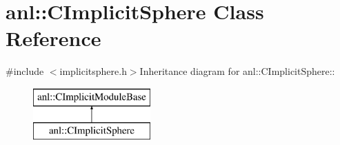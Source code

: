 \hypertarget{classanl_1_1CImplicitSphere}{
\section{anl::CImplicitSphere Class Reference}
\label{classanl_1_1CImplicitSphere}
}


{\ttfamily \#include $<$implicitsphere.h$>$}Inheritance diagram for anl::CImplicitSphere::\begin{figure}[H]
\begin{center}
\leavevmode
\includegraphics[height=2cm]{classanl_1_1CImplicitSphere}
\end{center}
\end{figure}
